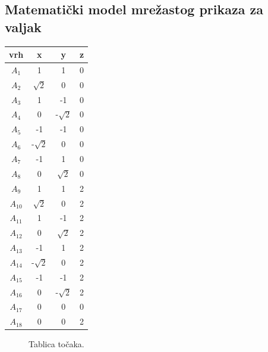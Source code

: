 \documentclass[a4paper,12pt]{article}
\begin{document}
\subsection{Matematički model mrežastog prikaza za valjak}
\begin{center}
    \begin{tabular}{||c | c | c | c ||} 
     \hline
     vrh & x & y & z \\ [0.5ex] 
     \hline
     $A_1$ & 1 & 1 & 0  \\ 
     \hline
     $A_2$ & $\sqrt{2}$ & 0 & 0  \\
     \hline
     $A_3$ & 1 & -1 & 0  \\
     \hline
     $A_4$ & 0 & -$\sqrt{2}$ & 0 \\
     \hline
     $A_5$ & -1 & -1 & 0  \\ 
     \hline
     $A_6$ & -$\sqrt{2}$ & 0 & 0  \\
     \hline
     $A_7$ & -1 & 1 & 0  \\
     \hline
     $A_8$ & 0  & $\sqrt{2}$ & 0 \\
     \hline
     $A_9$ & 1 & 1 & 2  \\
     \hline
     $A_{10}$& $\sqrt{2}$ & 0 & 2 \\
     \hline
     $A_{11}$ & 1 & -1 & 2  \\
     \hline
     $A_{12}$ & 0 & $\sqrt{2}$ & 2 \\
     \hline
     $A_{13}$ & -1 & 1 & 2  \\ 
     \hline
     $A_{14}$ & -$\sqrt{2}$ & 0 & 2  \\
     \hline
     $A_{15}$ & -1 & -1 & 2  \\
     \hline
     $A_{16}$ & 0 & -$\sqrt{2}$ & 2  \\
     \hline
     $A_{17}$ & 0  & 0 & 0 \\
     \hline
     $A_{18}$ & 0 & 0  & 2\\ [1ex] 
     \hline
    \end{tabular}
    \end{center}

    \begin{figure}[ht]
        \centering
        \caption{Tablica točaka.}
    \end{figure}
\end{document}
